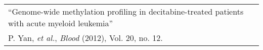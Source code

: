 \begin{tabularx}{\textwidth}{ X }
  ``Genome-wide methylation profiling in decitabine-treated patients with acute myeloid leukemia'' \\
  \small{P. Yan, \textit{et al.}, \textit{Blood} (2012), Vol. 20, no. 12.} \\
\end{tabularx}
